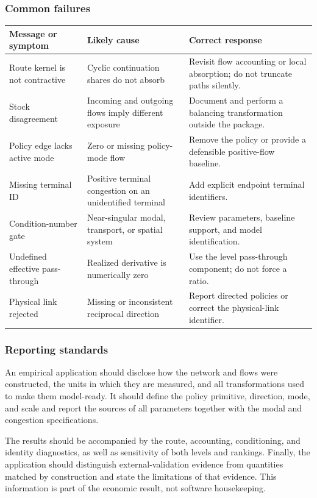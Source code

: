 \subsubsection{Common failures}

\begin{longtable}{L{0.30\textwidth}L{0.29\textwidth}L{0.33\textwidth}}
\toprule
Message or symptom & Likely cause & Correct response \\
\midrule
\endhead
Route kernel is not contractive & Cyclic continuation shares do not absorb &
Revisit flow accounting or local absorption; do not truncate paths silently. \\
Stock disagreement & Incoming and outgoing flows imply different exposure &
Document and perform a balancing transformation outside the package. \\
Policy edge lacks active mode & Zero or missing policy-mode flow & Remove the
policy or provide a defensible positive-flow baseline. \\
Missing terminal ID & Positive terminal congestion on an unidentified terminal
& Add explicit endpoint terminal identifiers. \\
Condition-number gate & Near-singular modal, transport, or spatial system &
Review parameters, baseline support, and model identification. \\
Undefined effective pass-through & Realized derivative is numerically zero &
Use the level pass-through component; do not force a ratio. \\
Physical link rejected & Missing or inconsistent reciprocal direction &
Report directed policies or correct the physical-link identifier. \\
\bottomrule
\end{longtable}

\subsubsection{Reporting standards}

An empirical application should disclose how the network and flows were
constructed, the units in which they are measured, and all transformations
used to make them model-ready. It should define the policy primitive,
direction, mode, and scale and report the sources of all parameters together
with the modal and congestion specifications.

The results should be accompanied by the route, accounting, conditioning, and
identity diagnostics, as well as sensitivity of both levels and rankings.
Finally, the application should distinguish external-validation evidence from
quantities matched by construction and state the limitations of that evidence.
This information is part of the economic result, not software housekeeping.

